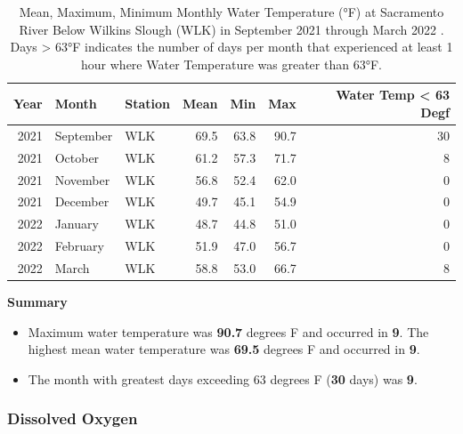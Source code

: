 \documentclass[
]{book}
\providecommand{\tightlist}{%
  \setlength{\itemsep}{0pt}\setlength{\parskip}{0pt}}
\theoremstyle{definition}
\theoremstyle{definition}
\theoremstyle{definition}
\theoremstyle{definition}
\theoremstyle{remark}
\begin{document}
\begin{table}
\centering
\caption{Mean, Maximum, Minimum Monthly Water Temperature (°F) at Sacramento River Below Wilkins Slough (WLK) in September 2021 through March 2022 . Days > 63°F indicates the number of days per month that experienced at least 1 hour where Water Temperature was greater than 63°F.}
\centering
\begin{tabular}[t]{rllrrrr}
\hline
Year & Month & Station & Mean & Min & Max & Water Temp < 63 Degf\\
\hline
2021 & September & WLK & 69.5 & 63.8 & 90.7 & 30\\
\hline
2021 & October & WLK & 61.2 & 57.3 & 71.7 & 8\\
\hline
2021 & November & WLK & 56.8 & 52.4 & 62.0 & 0\\
\hline
2021 & December & WLK & 49.7 & 45.1 & 54.9 & 0\\
\hline
2022 & January & WLK & 48.7 & 44.8 & 51.0 & 0\\
\hline
2022 & February & WLK & 51.9 & 47.0 & 56.7 & 0\\
\hline
2022 & March & WLK & 58.8 & 53.0 & 66.7 & 8\\
\hline
\end{tabular}
\end{table}

\textbf{Summary}

\begin{itemize}
\tightlist
\item
  Maximum water temperature was \textbf{90.7} degrees F and occurred in \textbf{9}. The highest mean water temperature was \textbf{69.5} degrees F and occurred in \textbf{9}.
\item
  The month with greatest days exceeding 63 degrees F (\textbf{30} days) was \textbf{9}.
\end{itemize}

\hypertarget{dissolved-oxygen-1}{%
\subsubsection{Dissolved Oxygen}\label{dissolved-oxygen-1}}
\end{document}
